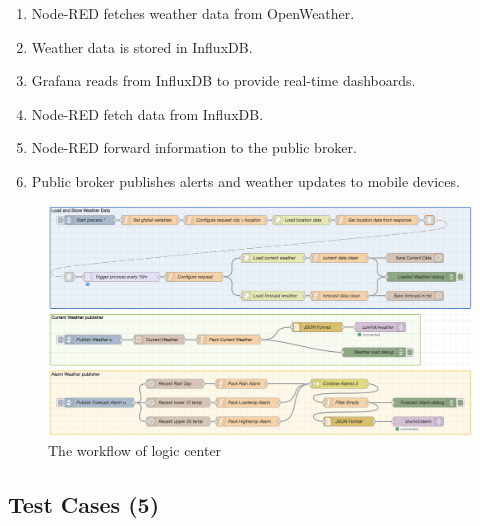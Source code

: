 \documentclass[11pt]{article}
\begin{document}
\begin{enumerate}
    \item Node-RED fetches weather data from OpenWeather.
    \item Weather data is stored in InfluxDB.
    \item Grafana reads from InfluxDB to provide real-time dashboards.
    \item Node-RED fetch data from InfluxDB.
    \item Node-RED forward information to the public broker.
    \item Public broker publishes alerts and weather updates to mobile devices.
\end{enumerate}

\begin{figure}[H]
    \centering
    \includegraphics[width=\textwidth]{pics/workflow.png}
    \caption{The workflow of logic center}
\end{figure}





\subsection{Test Cases (5)}
\renewcommand{\arraystretch}{1.5}





\clearpage



\end{document}
